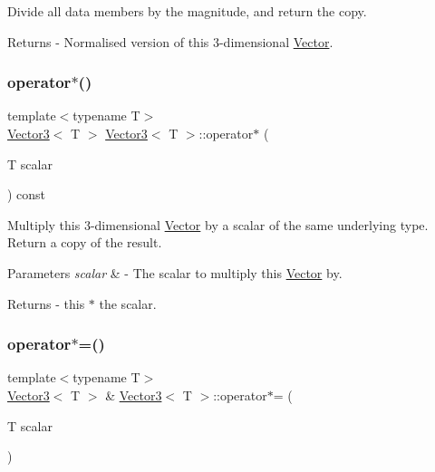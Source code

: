 Divide all data members by the magnitude, and return the copy. \begin{DoxyReturn}{Returns}
-\/ Normalised version of this 3-\/dimensional \mbox{\hyperlink{class_vector}{Vector}}. 
\end{DoxyReturn}
\mbox{\label{class_vector3_af1a6bd4542b3cb1d78fb90b81f9b3763}} 
\subsubsection{\texorpdfstring{operator$\ast$()}{operator*()}}
{\footnotesize\ttfamily template$<$typename T$>$ \\
\mbox{\hyperlink{class_vector3}{Vector3}}$<$ T $>$ \mbox{\hyperlink{class_vector3}{Vector3}}$<$ T $>$\+::operator$\ast$ (\begin{DoxyParamCaption}\item[{T}]{scalar }\end{DoxyParamCaption}) const}

Multiply this 3-\/dimensional \mbox{\hyperlink{class_vector}{Vector}} by a scalar of the same underlying type. Return a copy of the result. 
\begin{DoxyParams}{Parameters}
{\em scalar} & -\/ The scalar to multiply this \mbox{\hyperlink{class_vector}{Vector}} by. \\
\hline
\end{DoxyParams}
\begin{DoxyReturn}{Returns}
-\/ this $\ast$ the scalar. 
\end{DoxyReturn}
\mbox{\label{class_vector3_af44f1cfdedf62a46e803d838ed6640ad}} 
\subsubsection{\texorpdfstring{operator$\ast$=()}{operator*=()}}
{\footnotesize\ttfamily template$<$typename T$>$ \\
\mbox{\hyperlink{class_vector3}{Vector3}}$<$ T $>$ \& \mbox{\hyperlink{class_vector3}{Vector3}}$<$ T $>$\+::operator$\ast$= (\begin{DoxyParamCaption}\item[{T}]{scalar }\end{DoxyParamCaption})}

